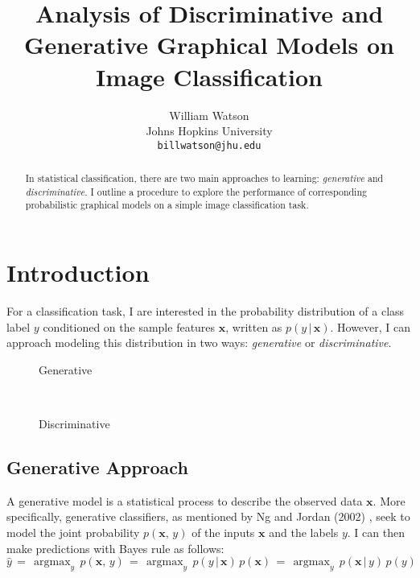 \documentclass{article}
\title{Analysis of Discriminative and Generative Graphical Models on Image Classification}
\author{%
  William Watson \\
  Johns Hopkins University\\
  \texttt{billwatson@jhu.edu} \\
}
\DeclareMathOperator*{\argmax}{argmax}
\begin{document}

\maketitle

\begin{abstract}
  In statistical classification, there are two main approaches to learning:
  \textit{generative} and \textit{discriminative}. I outline a procedure
  to explore the performance of corresponding probabilistic graphical models
  on a simple image classification task.
\end{abstract}

\section{Introduction}
For a classification task, I are interested in the probability distribution
of a class label $y$ conditioned on the sample features $\mathbf{x}$,
written as $p(y\,|\,\mathbf{x})$. However, I can approach modeling this
distribution in two ways: \textit{generative} or \textit{discriminative}.

\begin{figure*}[h!]
    \centering
    \begin{subfigure}[t]{0.15\textwidth}
        \centering
        \caption*{Generative}
    \end{subfigure}%
    ~
    \begin{subfigure}[t]{0.15\textwidth}
        \centering
        \caption*{Discriminative}
    \end{subfigure}
\end{figure*}

\subsection{Generative Approach}
A generative model is a statistical process to describe the observed data
$\mathbf{x}$. More specifically, generative classifiers, as mentioned by
Ng and Jordan (2002) \cite{NgJordan}, seek to
model the joint probability $p(\mathbf{x},\, y)$ of the inputs $\mathbf{x}$ and
the labels $y$. I can then make predictions with Bayes rule as
follows:
\begin{equation}
  \hat{y} \,=\, \argmax_y \, p(\mathbf{x}, \,y) \,=\, \argmax_y \, p(y \,|\, \mathbf{x}) \, p(\mathbf{x}) \,=\, \argmax_y \, p(\mathbf{x} \,|\, y) \, p(y)
\end{equation}
\end{document}
